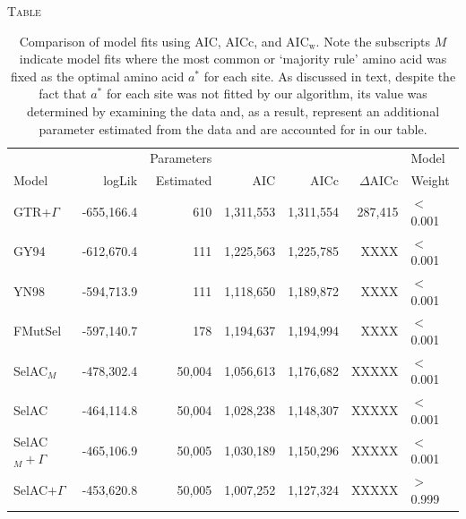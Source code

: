 \documentclass[12pt,letterpaper]{article}
\renewcommand{\section}[1]{%
\bigskip
\begin{center}
\begin{Large}
\normalfont\scshape #1
\medskip
\end{Large}
\end{center}}
\newcommand{\DeltaAICc}{\ensuremath{\Delta\text{AICc}}\xspace}
\newcommand{\AICw}{\ensuremath{\text{AIC}_\text{w}}\xspace}
\newcommand{\selac}{SelAC\xspace}
\newcommand{\selacplusgamma}{SelAC$+\Gamma$\xspace}
\newcommand{\selacmaj}{SelAC$_{M}$\xspace}
\newcommand{\selacmajplusgamma}{SelAC$_{M}+\Gamma$\xspace}
\newcommand{\aopt}{\ensuremath{a^*}\xspace}
\begin{document}


\renewcommand\refname{\begin{center}{\normalfont\scshape References}\end{center}}



\clearpage

\section{Table}

  \begin{table}[H]
    \begin{tabular}{lrrrrrl}
                                                &                  &Parameters &              &              &            &    Model\\
      Model                     & logLik   & Estimated &           AIC&          AICc&  \DeltaAICc&  Weight\\\hline
      GTR+$\Gamma$                      & -655,166.4&        610&         1,311,553&      1,311,554&     287,415& $<$0.001\\
      GY94                      & -612,670.4&        111&         1,225,563&         1,225,785&     XXXX& $<$0.001\\
      YN98                      & -594,713.9&        111&         1,118,650&         1,189,872&     XXXX& $<$0.001\\
      FMutSel                  & -597,140.7&       178&         1,194,637&         1,194,994&     XXXX& $<$0.001\\
      \selacmaj                     & -478,302.4&       50,004&   1,056,613&     1,176,682&      XXXXX&     $<$0.001\\
      \selac                    & -464,114.8&       50,004&   1,028,238&     1,148,307&      XXXXX&      $<$0.001\\
      \selacmajplusgamma            & -465,106.9&       50,005&   1,030,189&     1,150,296&      XXXXX& $<$0.001\\
      \selacplusgamma           & -453,620.8 &       50,005&   1,007,252&     1,127,324&           XXXXX& $>$0.999\\
    \end{tabular}
    \caption{Comparison of model fits using AIC, AICc, and \AICw.
Note the subscripts $M$ indicate model fits where the most common or `majority rule' amino acid was fixed as the optimal amino acid \aopt for each site.
As discussed in text, despite the fact that \aopt for each site was not fitted by our algorithm, its value was determined by examining the data and, as a result, represent an additional parameter estimated from the data and are accounted for in our table.
}
    \label{table:modelFits}
\end{table}
\end{document}
